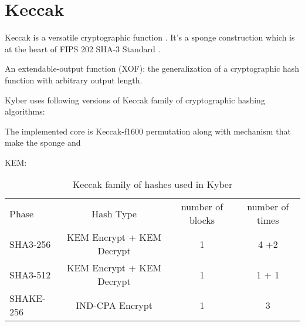 
\section{Keccak}
Keccak is a versatile cryptographic function \cite{zotero-2456}.
It's a sponge construction \cite{guido11} which is at the heart of FIPS 202 SHA-3 Standard \cite{dwork15}.

An extendable-output function (XOF): the generalization of a cryptographic hash function with arbitrary output length.

Kyber uses following versions of Keccak family of cryptographic hashing algorithms:


The implemented core is Keccak-f1600 permutation along with mechanism that make the sponge and 

KEM:
    \begin{table}
    \begin{adjustbox}{width=1.2\textwidth,center=\textwidth}
        \begin{tabular}{l*{3}{c}}
            \rowcolor{DispositionColor!50}              %
            Phase & Hash Type &  number of blocks & number of times \\ 
            SHA3-256  & KEM Encrypt + KEM Decrypt  &  1  &  4  +2 \\
            SHA3-512  &  KEM Encrypt + KEM Decrypt  &  1 &  1 + 1 \\
            SHAKE-256 & IND-CPA Encrypt  & 1 & 3 \\
             \hline
        \end{tabular}
        \end{adjustbox}
    \caption{Keccak family of hashes used in Kyber}
    \label{table:sha3}
    \end{table}



